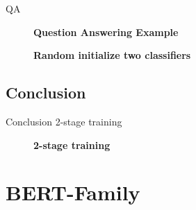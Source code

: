 \documentclass[10pt]{beamer}
\begin{document}
  \begin{frame}{QA}
    \begin{figure}
      \centering
      \caption{\textbf{Question Answering Example} }
    \end{figure}
    \begin{figure}
      \centering
      \caption{\textbf{Random initialize two classifiers} }
    \end{figure}

  \end{frame}

  \subsection{Conclusion}

  \begin{frame}{Conclusion}
    2-stage training
    \begin{figure}
      \centering
      \caption{\textbf{2-stage training} }
    \end{figure}
  \end{frame}

\section{BERT-Family}
\end{document}
